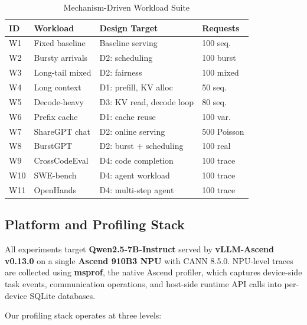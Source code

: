 \documentclass[conference]{IEEEtran}
\begin{document}
\begin{table}[htbp]
\caption{Mechanism-Driven Workload Suite}
\label{tab:workloads}
\begin{center}
\small
\begin{tabular}{@{}llp{}p{}@{}}
\toprule
\textbf{ID} & \textbf{Workload} & \textbf{Design Target} & \textbf{Requests} \\
\midrule
W1 & Fixed baseline   & Baseline serving        & 100 seq. \\
W2 & Bursty arrivals  & D2: scheduling          & 100 burst \\
W3 & Long-tail mixed  & D2: fairness            & 100 mixed \\
W4 & Long context     & D1: prefill, KV alloc   & 50 seq. \\
W5 & Decode-heavy     & D3: KV read, decode loop & 80 seq. \\
W6 & Prefix cache     & D1: cache reuse         & 100 var. \\
W7 & ShareGPT chat    & D2: online serving       & 500 Poisson \\
W8 & BurstGPT         & D2: burst + scheduling  & 100 real \\
W9 & CrossCodeEval    & D4: code completion      & 100 trace \\
W10 & SWE-bench       & D4: agent workload       & 100 trace \\
W11 & OpenHands       & D4: multi-step agent     & 100 trace \\
\bottomrule
\end{tabular}
\end{center}
\end{table}

\subsection{Platform and Profiling Stack}

All experiments target \textbf{Qwen2.5-7B-Instruct} served by
\textbf{vLLM-Ascend v0.13.0} on a single \textbf{Ascend 910B3 NPU} with
CANN 8.5.0. NPU-level traces are collected using \textbf{msprof}, the native
Ascend profiler, which captures device-side task events, communication
operations, and host-side runtime API calls into per-device SQLite databases.

Our profiling stack operates at three levels:
\end{document}
